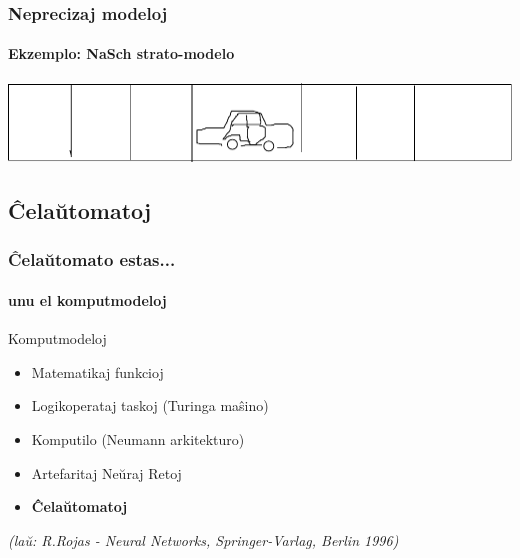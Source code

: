 \documentclass{beamer}
\begin{document}
%    
%    
%	
  
  \begin{frame}
  	\frametitle{Neprecizaj modeloj}
  	\framesubtitle{Ekzemplo: NaSch strato-modelo}
  	\includegraphics[scale=0.5]{auxto} 
  \end{frame}
  
  \subsection{Ĉelaŭtomatoj}
  
  \begin{frame}
  	\frametitle{Ĉelaŭtomato estas...}
  	\framesubtitle{unu el komputmodeloj}
  	
  	Komputmodeloj
  	\begin{itemize}
  		\item Matematikaj funkcioj
  		\item Logikoperataj taskoj (Turinga maŝino)
  		\item Komputilo (Neumann arkitekturo)
  		\item Artefaritaj Neŭraj Retoj
  		\item \textbf{Ĉelaŭtomatoj}
  	\end{itemize}
  	\begin{footnotesize}
  		\textit{(laŭ: R.Rojas - Neural Networks, Springer-Varlag, Berlin 1996)}
  		
  	\end{footnotesize}
  \end{frame}
  
\end{document}
